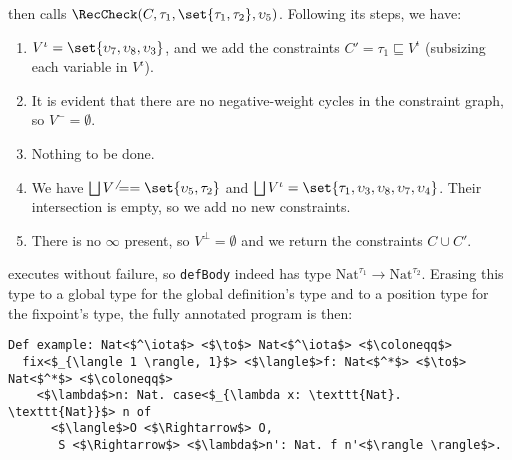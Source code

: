 

\RecCheckLoop then calls $\RecCheck(C, \tau_1, \set{\tau_1, \tau_2}, \upsilon_5)$.
Following its steps, we have:
\begin{enumerate}
    \item $V^\iota = \set{\upsilon_7, \upsilon_8, \upsilon_3}$, and we add the constraints $C' = \tau_1 \sqsubseteq V^\iota$ (subsizing each variable in $V^\iota$).
    \item It is evident that there are no negative-weight cycles in the constraint graph, so $V^- = \emptyset$.
    \item Nothing to be done.
    \item We have $\bigsqcup V^\neq = \set{\upsilon_5, \tau_2}$ and $\bigsqcup V^\iota = \set{\tau_1, \upsilon_3, \upsilon_8, \upsilon_7, \upsilon_4}$.
      Their intersection is empty, so we add no new constraints.
    \item There is no $\infty$ present, so $V^\bot = \emptyset$ and we return the constraints $C \cup C'$.
\end{enumerate}

\RecCheckLoop executes without failure, so \texttt{defBody} indeed has type $\text{Nat}^{\tau_1} \to \text{Nat}^{\tau_2}$.
Erasing this type to a global type for the global definition's type and to a position type for the fixpoint's type, the fully annotated program is then:

\begin{verbatim}
Def example: Nat<$^\iota$> <$\to$> Nat<$^\iota$> <$\coloneqq$>
  fix<$_{\langle 1 \rangle, 1}$> <$\langle$>f: Nat<$^*$> <$\to$> Nat<$^*$> <$\coloneqq$>
    <$\lambda$>n: Nat. case<$_{\lambda x: \texttt{Nat}. \texttt{Nat}}$> n of
      <$\langle$>O <$\Rightarrow$> O,
       S <$\Rightarrow$> <$\lambda$>n': Nat. f n'<$\rangle \rangle$>.
\end{verbatim}

